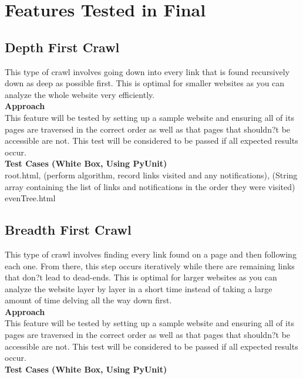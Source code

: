 \documentclass[12pt, titlepage]{article}
\begin{document}
\section{Features Tested in Final}
\subsection{Depth First Crawl}
This type of crawl involves going down into every link that is found recursively down as deep as possible first. This is optimal for smaller websites as you can analyze the whole website very efficiently.\\

\textbf{Approach}\\

This feature will be tested by setting up a sample website and ensuring all of its pages are traversed in the correct order as well as that pages that shouldn?t be accessible are not. This test will be considered to be passed if all expected results occur.\\

\textbf{Test Cases (White Box, Using PyUnit)}\\

root.html, (perform algorithm, record links visited and any notifications), (String array containing the list of links and notifications in the order they were visited)
evenTree.html

\subsection{Breadth First Crawl}
This type of crawl involves finding every link found on a page and then following each one. From there, this step occurs iteratively while there are remaining links that don?t lead to dead-ends. This is optimal for larger websites as you can analyze the website layer by layer in a short time instead of taking a large amount of time delving all the way down first.\\

\textbf{Approach}\\

This feature will be tested by setting up a sample website and ensuring all of its pages are traversed in the correct order as well as that pages that shouldn?t be accessible are not. This test will be considered to be passed if all expected results occur.\\

\textbf{Test Cases (White Box, Using PyUnit)}\\
\end{document}
